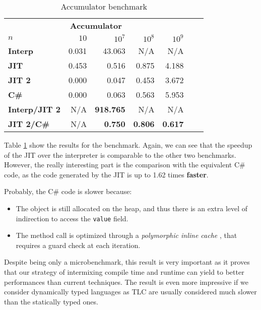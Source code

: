 \begin{table}[ht]
  \begin{center}

  \begin{tabular}{l|rrrrrr}
    \multicolumn{5}{c}{\textbf{Accumulator}} \\ [0.5ex]

    \textbf{$n$}          & $10$  & $10^7$           & $10^8$         & $10^9$         \\
    \hline
    \textbf{Interp}       & 0.031 & 43.063           & N/A            & N/A            \\
    \textbf{JIT}          & 0.453 &  0.516           & 0.875          & 4.188          \\
    \textbf{JIT 2}        & 0.000 &  0.047           & 0.453          & 3.672          \\
    \textbf{C\#}          & 0.000 &  0.063           & 0.563          & 5.953          \\
    \textbf{Interp/JIT 2} & N/A   & \textbf{918.765} & N/A            & N/A            \\
    \textbf{JIT 2/C\#}    & N/A   & \textbf{0.750}   & \textbf{0.806} & \textbf{0.617} \\

  \end{tabular}
  \end{center}
  \caption{Accumulator benchmark}
  \label{tab:accumulator}
\end{table}





Table \ref{tab:accumulator} show the results for the benchmark.  Again, we can
see that the speedup of the JIT over the interpreter is comparable to the
other two benchmarks.  However, the really interesting part is the comparison
with the equivalent C\# code, as the code generated by the JIT is up to 1.62 times
\textbf{faster}.

Probably, the C\# code is slower because:

\begin{itemize}
\item The object is still allocated on the heap, and thus there is an extra
  level of indirection to access the \lstinline{value} field.
\item The method call is optimized through a \emph{polymorphic inline cache}
  \cite{hoelzle_optimizing_1991}, that requires a guard check at each iteration.
\end{itemize}


Despite being only a microbenchmark, this result is very important as it proves
that our strategy of intermixing compile time and runtime can yield to better
performances than current techniques.  The result is even more impressive if
we consider dynamically typed languages as TLC are usually considered much
slower than the statically typed ones.
